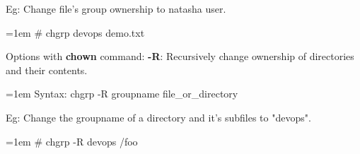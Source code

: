 \begin{flushleft}
Eg: Change file's group ownership to natasha user.
\begin{tcolorbox}[breakable,notitle,boxrule=-0pt,colback=black,colframe=black]
		\color{green}
		\font=1em
		\# chgrp devops demo.txt
		\font=4pt
\end{tcolorbox}
	
Options with \textbf{chown} command:	
\newline
\textbf{-R}: Recursively change ownership of directories and their contents.
\begin{tcolorbox}[breakable,notitle,boxrule=0pt,colback=pink,colframe=pink]
	\color{black}
	\font=1em
	Syntax: chgrp -R groupname file\_or\_directory
	\font=4pt
\end{tcolorbox}
\newline
Eg: Change the groupname of a directory and it's subfiles to "devops".
\begin{tcolorbox}[breakable,notitle,boxrule=-0pt,colback=black,colframe=black]
	\color{green}
	\font=1em
	\# chgrp -R devops /foo
	\font=4pt
\end{tcolorbox}


	
\end{flushleft}

\newpage

